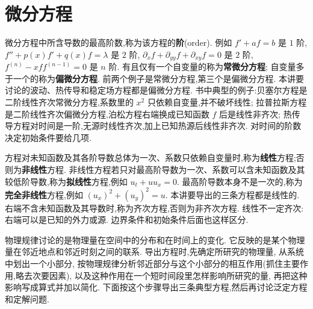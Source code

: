 \section{微分方程}

微分方程中所含导数的最高阶数,称为该方程的\textbf{阶}(order).
例如 $f'+af=b$ 是 $1$ 阶,
$f''+p(x)f'+q(x)f=\lambda$ 是 $2$ 阶,
$\partial_x f+\partial_{yy}f+\partial_{xy}f=0$ 是 $2$ 阶,
$f^{(n)}-x f f^{(n-1)}=0$ 是 $n$ 阶.
有且仅有一个自变量的称为\textbf{常微分方程};
自变量多于一个的称为\textbf{偏微分方程}.
前两个例子是常微分方程,第三个是偏微分方程.
本讲要讨论的波动、热传导和稳定场方程都是偏微分方程.
书中典型的例子:贝塞尔方程是二阶线性齐次常微分方程,系数里的 $x^2$ 只依赖自变量,并不破坏线性;
拉普拉斯方程是二阶线性齐次偏微分方程,泊松方程右端换成已知函数 $f$ 后是线性非齐次;
热传导方程对时间是一阶,无源时线性齐次,加上已知热源后线性非齐次.
对时间的阶数决定初始条件要给几项.

方程对未知函数及其各阶导数总体为一次、系数只依赖自变量时,称为\textbf{线性}方程;否则为\textbf{非线性}方程.
非线性方程若只对最高阶导数为一次、系数可以含未知函数及其较低阶导数,称为\textbf{拟线性}方程,例如 $u_t+u u_x=0$.
最高阶导数本身不是一次的,称为\textbf{完全非线性}方程,例如 $(u_x)^2+(u_y)^2=u$.
本讲要导出的三条方程都是线性的.
右端不含未知函数及其导数时,称为齐次方程,否则为非齐次方程.
线性不一定齐次:右端可以是已知的外力或源.
边界条件和初始条件后面也这样区分.

物理规律讨论的是物理量在空间中的分布和在时间上的变化.
它反映的是某个物理量在邻近地点和邻近时刻之间的联系.
导出方程时,先确定所研究的物理量,
从系统中划出一个小部分,
按物理规律分析邻近部分与这个小部分的相互作用(抓住主要作用,略去次要因素),
以及这种作用在一个短时间段里怎样影响所研究的量,
再把这种影响写成算式并加以简化.
下面按这个步骤导出三条典型方程,然后再讨论泛定方程和定解问题.
